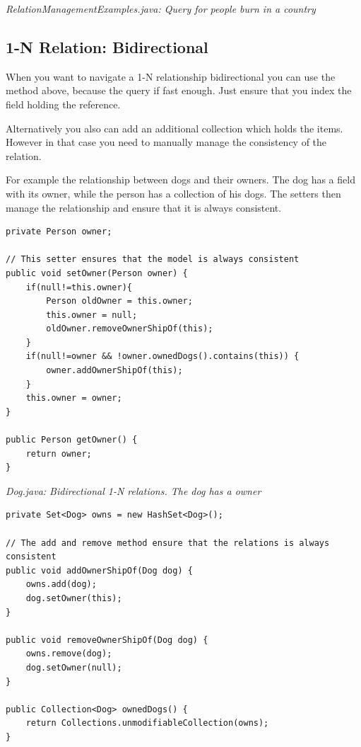 {\small\itshape RelationManagementExamples.java: Query for people burn in a country\par}
\medskip

\subsection{1-N Relation: Bidirectional}
\label{ref:best-practises-managing-relations:1ton-bidirect}

When you want to navigate a 1-N relationship bidirectional you can use the method above, because the query if fast enough. Just ensure that you index the field holding the reference.

Alternatively you also can add an additional collection which holds the items. However in that case you need to manually manage the consistency of the relation.

For example the relationship between dogs and their owners. The dog has a field with its owner, while the person has a collection of his dogs. The setters then manage the relationship and ensure that it is always consistent.

\begin{lstlisting}
private Person owner;

// This setter ensures that the model is always consistent
public void setOwner(Person owner) {
    if(null!=this.owner){
        Person oldOwner = this.owner;
        this.owner = null;
        oldOwner.removeOwnerShipOf(this);
    }
    if(null!=owner && !owner.ownedDogs().contains(this)) {
        owner.addOwnerShipOf(this);
    }
    this.owner = owner;
}

public Person getOwner() {
    return owner;
}
\end{lstlisting}

{\small\itshape Dog.java: Bidirectional 1-N relations. The dog has a owner\par}
\medskip

\begin{lstlisting}
private Set<Dog> owns = new HashSet<Dog>();

// The add and remove method ensure that the relations is always consistent
public void addOwnerShipOf(Dog dog) {
    owns.add(dog);
    dog.setOwner(this);
}

public void removeOwnerShipOf(Dog dog) {
    owns.remove(dog);
    dog.setOwner(null);
}

public Collection<Dog> ownedDogs() {
    return Collections.unmodifiableCollection(owns);
}
\end{lstlisting}

